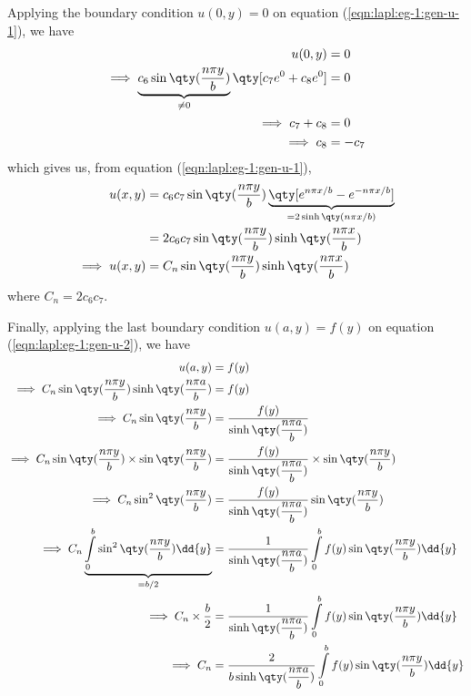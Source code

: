 \begin{enumerate}
            Applying the boundary condition $u(0,y)=0$ on equation (\ref{eqn:lapl:eg-1:gen-u-1}), we have
            \begin{align*}
                u(0,y)&=0 \\
                \implies \underbrace{c_6\sin\qty(\dfrac{n\pi y}{b})}_{\neq 0}\qty[c_7e^{0}+c_8e^{0}]&=0 \\
                \implies c_7+c_8&=0 \\
                \implies c_8&=-c_7
            \end{align*}
            which gives us, from equation (\ref{eqn:lapl:eg-1:gen-u-1}),
            \begin{align}
                u(x,y)&=c_6c_7\sin\qty(\dfrac{n\pi y}{b})\underbrace{\qty[e^{n\pi x/b}-e^{-n\pi x/b}]}_{=2\sinh\qty({n\pi x}/{b})} \nonumber\\
                    &=2c_6c_7\sin\qty(\dfrac{n\pi y}{b})\sinh\qty(\dfrac{n\pi x}{b}) \nonumber\\
                \implies u(x,y)&=C_n\sin\qty(\dfrac{n\pi y}{b})\sinh\qty(\dfrac{n\pi x}{b}) \label{eqn:lapl:eg-1:gen-u-2}
            \end{align}
            where $C_n=2c_6c_7$.

            Finally, applying the last boundary condition $u(a,y)=f(y)$ on equation (\ref{eqn:lapl:eg-1:gen-u-2}), we have
            \begin{align}
                u(a,y)&=f(y) \nonumber\\
                \implies C_n\sin\qty(\dfrac{n\pi y}{b})\sinh\qty(\dfrac{n\pi a}{b})&=f(y) \nonumber\\
                \implies C_n\sin\qty(\dfrac{n\pi y}{b})&=\dfrac{f(y)}{\sinh\qty(\dfrac{n\pi a}{b})} \nonumber\\
                \implies C_n\sin\qty(\dfrac{n\pi y}{b})\times\sin\qty(\dfrac{n\pi y}{b})&=\dfrac{f(y)}{\sinh\qty(\dfrac{n\pi a}{b})}\times\sin\qty(\dfrac{n\pi y}{b}) \nonumber\\
                \implies C_n\sin^2\qty(\dfrac{n\pi y}{b})&=\dfrac{f(y)}{\sinh\qty(\dfrac{n\pi a}{b})}\sin\qty(\dfrac{n\pi y}{b}) \nonumber\\
                \implies C_n\underbrace{\int\limits_{0}^{b}{\sin^2\qty(\dfrac{n\pi y}{b}) \dd{y}}}_{={b}/{2}}&=\dfrac{1}{\sinh\qty(\dfrac{n\pi a}{b})}\int\limits_{0}^{b}{f(y)\sin\qty(\dfrac{n\pi y}{b}) \dd{y}} \nonumber\\
                \implies C_n\times\dfrac{b}{2}&=\dfrac{1}{\sinh\qty(\dfrac{n\pi a}{b})}\int\limits_{0}^{b}{f(y)\sin\qty(\dfrac{n\pi y}{b}) \dd{y}} \nonumber\\
                \implies C_n&=\dfrac{2}{b\sinh\qty(\dfrac{n\pi a}{b})}\int\limits_{0}^{b}{f(y)\sin\qty(\dfrac{n\pi y}{b}) \dd{y}} \label{eqn:lapl:eg-1:Cn}
            \end{align}


\end{enumerate}
